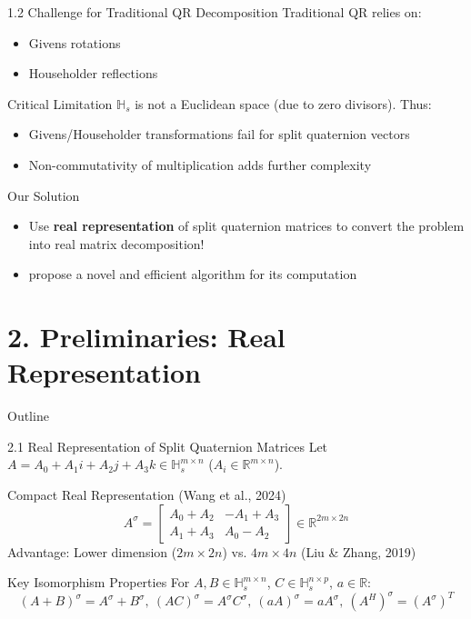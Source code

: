 \documentclass{beamer}
\begin{document}
\begin{frame}{1.2 Challenge for Traditional QR Decomposition}
  Traditional QR relies on:
  \begin{itemize}
    \item Givens rotations
    \item Householder reflections
  \end{itemize}
  
  \begin{alertblock}{Critical Limitation}
    $\mathbb{H}_s$ is not a Euclidean space (due to zero divisors). Thus:
  \begin{itemize}
    \item Givens/Householder transformations fail for split quaternion vectors 
    \item Non-commutativity of multiplication adds further complexity
  \end{itemize}
\end{alertblock}
  
  \begin{block}{Our Solution}
   \begin{itemize}
    \item Use \textbf{real representation} of split quaternion matrices to convert the problem into real matrix decomposition!
    \item propose a novel and efficient algorithm for its computation
   \end{itemize}
  \end{block}
\end{frame}

\section{2. Preliminaries: Real Representation}
\begin{frame}{Outline}
  \tableofcontents[sectionstyle=show/shaded, subsectionstyle=show/show/shaded]
\end{frame}

\begin{frame}{2.1 Real Representation of Split Quaternion Matrices}
  Let $A = A_0 + A_1i + A_2j + A_3k \in \mathbb{H}_s^{m \times n}$ ($A_i \in \mathbb{R}^{m \times n}$).
  
  \begin{block}{Compact Real Representation (Wang et al., 2024)}
    \[
    A^\sigma = \begin{bmatrix}
    A_0 + A_2 & -A_1 + A_3 \\
    A_1 + A_3 & A_0 - A_2
    \end{bmatrix} \in \mathbb{R}^{2m \times 2n}
    \]
    Advantage: Lower dimension ($2m \times 2n$) vs. $4m \times 4n$ (Liu \& Zhang, 2019)
  \end{block}
  
  \begin{block}{Key Isomorphism Properties}
    For $A,B \in \mathbb{H}_s^{m \times n}$, $C \in \mathbb{H}_s^{n \times p}$, $a \in \mathbb{R}$:
    \[
    (A+B)^\sigma = A^\sigma+B^\sigma,\ (AC)^\sigma = A^\sigma C^\sigma,\ (aA)^\sigma = aA^\sigma,\ (A^H)^\sigma = (A^\sigma)^T
    \]
  \end{block}
\end{frame}
\end{document}
